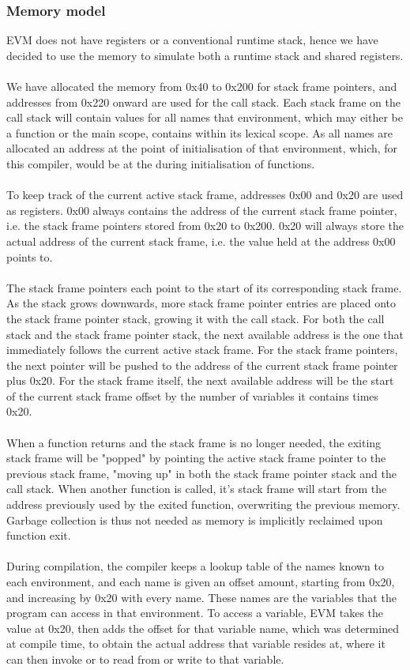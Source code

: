 \subsubsection{Memory model}
EVM does not have registers or a conventional runtime stack, hence we have decided to use the memory to simulate both a runtime stack and shared registers. \\\\
We have allocated the memory from 0x40 to 0x200 for stack frame pointers, and addresses from 0x220 onward are used for the call stack. Each stack frame on the call stack will contain values for all names that environment, which may either be a function or the main scope, contains within its lexical scope. As all names are allocated an address at the point of initialisation of that environment, which, for this compiler, would be at the during initialisation of functions. \\\\
To keep track of the current active stack frame, addresses 0x00 and 0x20 are used as registers. 0x00 always contains the address of the current stack frame pointer, i.e. the stack frame pointers stored from 0x20 to 0x200. 0x20 will always store the actual address of the current stack frame, i.e. the value held at the address 0x00 points to. \\\\
The stack frame pointers each point to the start of its corresponding stack frame. As the stack grows downwards, more stack frame pointer entries are placed onto the stack frame pointer stack, growing it with the call stack. For both the call stack and the stack frame pointer stack, the next available address is the one that immediately follows the current active stack frame. For the stack frame pointers, the next pointer will be pushed to the address of the current stack frame pointer plus 0x20. For the stack frame itself, the next available address will be the start of the current stack frame offset by the number of variables it contains times 0x20. \\\\
When a function returns and the stack frame is no longer needed, the exiting stack frame will be "popped" by pointing the active stack frame pointer to the previous stack frame, "moving up" in both the stack frame pointer stack and the call stack. When another function is called, it's stack frame will start from the address previously used by the exited function, overwriting the previous memory. Garbage collection is thus not needed as memory is implicitly reclaimed upon function exit. \\\\
During compilation, the compiler keeps a lookup table of the names known to each environment, and each name is given an offset amount, starting from 0x20, and increasing by 0x20 with every name. These names are the variables that the program can access in that environment. To access a variable, EVM takes the value at 0x20, then adds the offset for that variable name, which was determined at compile time, to obtain the actual address that variable resides at, where it can then invoke  or  to read from or write to that variable. \\


